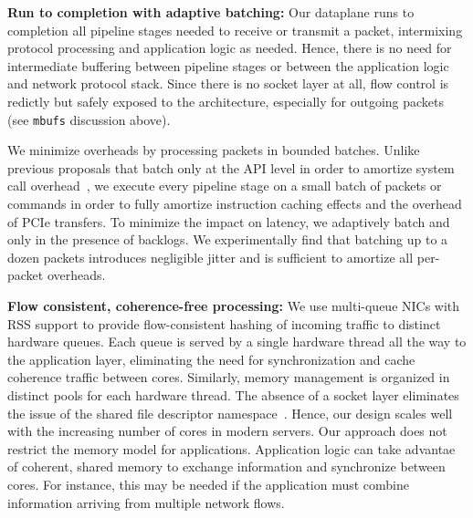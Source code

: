 

{\bf Run to completion with adaptive batching:} Our dataplane 
runs to completion all pipeline stages needed to receive or transmit a
packet, intermixing protocol processing and application logic as
needed. Hence, there is no need for intermediate buffering between
pipeline stages or between the application logic and network protocol
stack. Since there is no socket layer at all, flow control is redictly
but safely exposed to the architecture, especially for outgoing
packets (see \texttt{mbufs} discussion  above).

We minimize overheads by processing packets in bounded batches.
Unlike previous proposals that batch only at the API level in order to
amortize system call overhead~\cite{jeong2014mtcp,han2012megapipe}, we
execute every pipeline stage on a small batch of packets or commands
in order to fully amortize instruction caching effects and the
overhead of PCIe transfers. To minimize the impact on latency, we
adaptively batch and only in the presence of backlogs. We
experimentally find that batching up to a dozen 
packets introduces negligible jitter and is sufficient to amortize all
per-packet overheads.


{\bf Flow consistent, coherence-free processing:} We use multi-queue
NICs with RSS support to provide flow-consistent hashing of incoming
traffic to distinct hardware queues. Each queue is served by a single
hardware thread all the way to the application layer, eliminating the
need for synchronization and cache coherence traffic between
cores. Similarly, memory management is organized in distinct pools for
each hardware thread. The absence of a socket layer eliminates the
issue of the shared file descriptor namespace~\cite{missing}. Hence,
our design scales well with the increasing number of cores in modern
servers. Our approach does not restrict the memory model for
applications. Application logic can take advantae of coherent, shared
memory to exchange information and synchronize between cores. For
instance, this may be needed if the application must combine
information arriving from multiple network flows.



